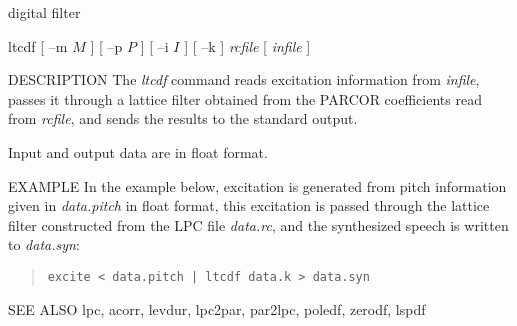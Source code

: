 %
{digital filter}

\begin{synopsis}
\item [ltcdf] [ --m $M$ ] [ --p $P$ ] [ --i $I$ ] [ --k ] {\em rcfile} 
	      [ {\em infile} ] 
\end{synopsis}

\begin{qsection}{DESCRIPTION}
The {\em ltcdf} command reads excitation information from
{\em infile},  passes it through a lattice filter
obtained from the PARCOR coefficients read from {\em rcfile},
and sends the results to the standard output.
\par
Input and output data are in float format.
\end{qsection}

\begin{options}
\end{options}

\begin{qsection}{EXAMPLE}
In the example below, excitation is generated from
pitch information given in {\em data.pitch} in float format,
this excitation is passed through the lattice filter
constructed from the LPC file {\em data.rc},
and the synthesized speech is written to {\em data.syn}:
\begin{quote}
 \verb!excite < data.pitch | ltcdf data.k > data.syn!
\end{quote} 
\end{qsection}

\begin{qsection}{SEE ALSO}
 lpc, acorr, levdur, lpc2par, par2lpc, poledf, zerodf, lspdf
\end{qsection}
